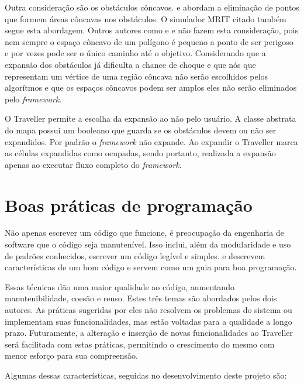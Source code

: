 Outra consideração são os obstáculos côncavos. \cite{Siegwart2004} e \cite{Guzman2008} abordam a eliminação de pontos que formem áreas côncavas nos obstáculos. O simulador MRIT citado também segue esta abordagem. Outros autores como \cite{Thomsen2010} e \cite{Choset2005} e  não fazem esta consideração, pois nem sempre o espaço côncavo de um polígono é pequeno a ponto de ser perigoso e por vezes pode ser o único caminho até o objetivo. Considerando que a expansão dos obstáculos já dificulta a chance de choque e que nós que representam um vértice de uma região côncava não serão escolhidos pelos algorítmos e que os espaços côncavos podem ser amplos eles não serão eliminados pelo \textit{framework}.

O Traveller permite a escolha da expansão ao não pelo usuário. A classe abstrata do mapa possui um booleano que guarda se os obstáculos devem ou não ser expandidos. Por padrão o \textit{framework} não expande. Ao expandir o Traveller marca as células expandidas como ocupadas, sendo portanto, realizada a expansão apenas ao executar fluxo completo do \textit{framework}.

\section{Boas práticas de programação}

Não apenas escrever um código que funcione, é preocupação da engenharia de software que o código seja manutenível. Isso inclui, além da modularidade e uso de padrões conhecidos, escrever um código legível e simples. \cite{Goodliffe2007} e \cite{McConnel2004} descrevem características de um bom código e servem como um guia para boa programação.

Essas técnicas dão uma maior qualidade ao código, aumentando manutenibilidade, coesão e reuso. Estes três temas são abordados pelos dois autores. As práticas sugeridas por eles não resolvem os problemas do sistema ou implementam suas funcionalidades, mas estão voltadas para a qualidade a longo prazo. Futuramente, a alteração e inserção de novas funcionalidades ao Traveller será facilitada com estas práticas, permitindo o crescimento do mesmo com menor esforço para sua compreensão.

Algumas dessas características, seguidas no desenvolvimento deste projeto são:

